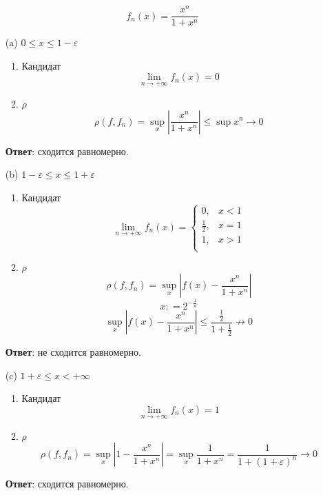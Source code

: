 \begin{exercise}[2751]
    \[f_n(x) = \frac{x^n}{1 + x^n}\]

    \begin{itemize}
        \item [(a)] \(0 \leq x \leq 1 - \varepsilon\)

              \begin{enumerate}
                  \item Кандидат
                        \[\lim_{n\to +\infty} f_n(x) = 0\]
                  \item \(\rho\)
                        \[\rho(f, f_n) = \sup_{x} \left|\frac{x^n}{1 + x^n}\right| \leq \sup x^n \to 0\]
              \end{enumerate}

              \textbf{Ответ}: сходится равномерно.

        \item [(b)] \(1 - \varepsilon \leq x \leq 1 + \varepsilon\)

              \begin{enumerate}
                  \item Кандидат
                        \[\lim_{n\to +\infty} f_n(x) = \begin{cases}
                                0,           & x < 1 \\
                                \frac{1}{2}, & x = 1 \\
                                1,           & x > 1 \\
                            \end{cases}\]
                  \item \(\rho\)
                        \[\rho(f, f_n) = \sup_x \left|f(x) - \frac{x^n}{1 + x^n}\right|\]
                        \[x: = 2^{ - \frac{1}{n}}\]
                        \[\sup_x \left|f(x) - \frac{x^n}{1 + x^n}\right| \leq \frac{\frac{1}{2}}{1 + \frac{1}{2}} \not\to 0\]
              \end{enumerate}

              \textbf{Ответ}: не сходится равномерно.

        \item [(c)] \(1 + \varepsilon \leq x < +\infty\)

              \begin{enumerate}
                  \item Кандидат
                        \[\lim_{n\to +\infty} f_n(x) = 1\]
                  \item \(\rho\)
                        \[\rho(f, f_n) = \sup_{x} \left|1 - \frac{x^n}{1 + x^n}\right| = \sup_{x} \frac{1}{1 + x^n} = \frac{1}{1 + (1 + \varepsilon)^n} \to 0\]
              \end{enumerate}

              \textbf{Ответ}: сходится равномерно.
    \end{itemize}
\end{exercise}

